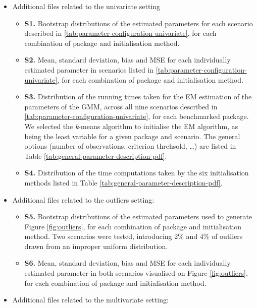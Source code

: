 \begin{itemize}
\item
  Additional files related to the univariate setting

  \begin{itemize}
  \tightlist
  \item
    \textbf{S1.} Bootstrap distributions of the estimated parameters for each
    scenario described in \ref{tab:parameter-configuration-univariate}, for each
    combination of package and initialisation method.
  \item
    \textbf{S2.} Mean, standard deviation, bias and MSE for each individually
    estimated parameter in scenarios listed in \ref{tab:parameter-configuration-univariate}, for each
    combination of package and initialisation method.
  \item
    \textbf{S3.} Distribution of the running times taken for the EM estimation of the parameters of the GMM, across all nine scenarios described in \ref{tab:parameter-configuration-univariate}, for each benchmarked package. We selected the \emph{k}-means
    algorithm to initialise the EM algorithm, as being the least variable for a given package and scenario. The general options (number of observations, criterion threhsold, \ldots) are listed in Table \ref{tab:general-parameter-description-pdf}.
  \item
    \textbf{S4.} Distribution of the time computations taken by the six initialisation methods listed in Table \ref{tab:general-parameter-description-pdf}.
  \end{itemize}
\item
  Additional files related to the outliers setting:

  \begin{itemize}
  \tightlist
  \item
    \textbf{S5.} Bootstrap distributions of the estimated parameters used to
    generate Figure \ref{fig:outliers}, for each combination of package
    and initialisation method. Two scenarios were tested, introducing
    \(2 \%\) and \(4 \%\) of outliers drawn from an improper uniform distribution.
  \item
    \textbf{S6.} Mean, standard deviation, bias and MSE for each individually
    estimated parameter in both scenarios visualised on Figure
    \ref{fig:outliers}, for each combination of package and
    initialisation method.
  \end{itemize}
\item
  Additional files related to the multivariate setting:


\end{itemize}
